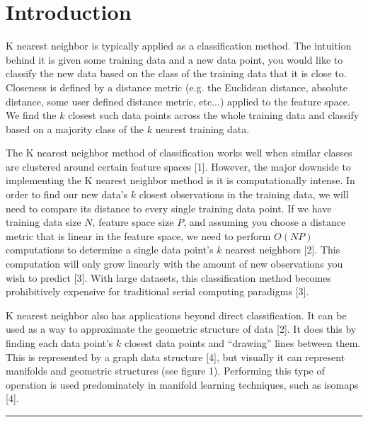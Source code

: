 \section{Introduction}

\vspace{5 mm}
\noindent
K nearest neighbor is typically applied as a classification method. The 
intuition behind it is given some training data and a new data point, you would 
like to classify the new data based on the class of the training data that it 
is close to. Closeness is defined by a distance metric (e.g. the Euclidean 
distance, absolute distance, some user defined distance metric, etc...) applied 
to the feature space. We find the $k$ closest such data points across the whole 
training data and classify based on a majority class of the $k$ nearest 
training data.

\vspace{5 mm}
\noindent
The K nearest neighbor method of classification works well when similar classes 
are clustered around certain feature spaces [1]. However, the major downside to 
implementing the K nearest neighbor method is it is computationally intense. 
In order to find our new data's $k$ closest observations in the training data, 
we will need to compare its distance to every single training data point. 
If we have training data size $N$, feature space size $P$, and assuming you 
choose a distance metric that is linear in the feature space, we need to 
perform $O(NP)$ computations to determine a single data point's $k$ nearest 
neighbors [2]. This computation will only grow linearly with the amount of new 
observations you wish to predict [3]. With large datasets, this classification 
method becomes prohibitively expensive for traditional serial computing 
paradigms [3].


\vspace{5 mm}
\noindent
K nearest neighbor also has applications beyond direct classification. It can 
be used as a way to approximate the geometric structure of data [2]. It does 
this by finding each data point's $k$ closest data points and ``drawing'' lines 
between them. This is represented by a graph data structure [4], but visually it 
can represent manifolds and geometric structures (see figure 1). Performing 
this type of operation is used predominately in manifold learning techniques, 
such as isomaps [4].

\newpage

\noindent\rule{12.1cm}{0.4pt}

